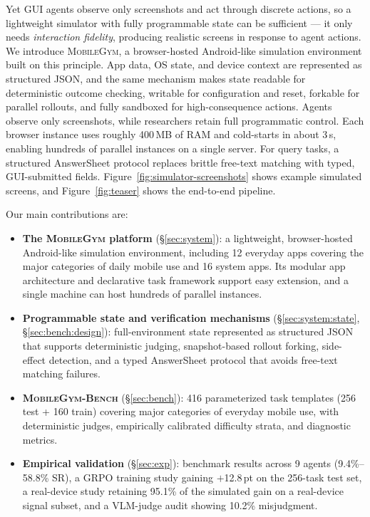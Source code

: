 \documentclass{llmxive}
\providecommand{\sys}{\textsc{MobileGym}}
\providecommand{\bench}{\textsc{MobileGym-Bench}}
\begin{document}
Yet GUI agents observe only screenshots and act through discrete actions, so a lightweight simulator with fully programmable state can be sufficient --- it only needs \emph{interaction fidelity}, producing realistic screens in response to agent actions. We introduce \sys{}, a browser-hosted Android-like simulation environment built on this principle. App data, OS state, and device context are represented as structured JSON, and the same mechanism makes state readable for deterministic outcome checking, writable for configuration and reset, forkable for parallel rollouts, and fully sandboxed for high-consequence actions. Agents observe only screenshots, while researchers retain full programmatic control. Each browser instance uses roughly 400\,MB of RAM and cold-starts in about 3\,s, enabling hundreds of parallel instances on a single server. For query tasks, a structured AnswerSheet protocol replaces brittle free-text matching with typed, GUI-submitted fields. Figure~\ref{fig:simulator-screenshots} shows example simulated screens, and Figure~\ref{fig:teaser} shows the end-to-end pipeline.

Our main contributions are:

\begin{itemize}
  \item \textbf{The \sys{} platform} (§\ref{sec:system}): a lightweight, browser-hosted Android-like simulation environment, including 12 everyday apps covering the major categories of daily mobile use and 16 system apps. Its modular app architecture and declarative task framework support easy extension, and a single machine can host hundreds of parallel instances.

  \item \textbf{Programmable state and verification mechanisms} (§\ref{sec:system:state}, §\ref{sec:bench:design}): full-environment state represented as structured JSON that supports deterministic judging, snapshot-based rollout forking, side-effect detection, and a typed AnswerSheet protocol that avoids free-text matching failures.

  \item \textbf{\bench{}} (§\ref{sec:bench}): 416 parameterized task templates (256 test + 160 train) covering major categories of everyday mobile use, with deterministic judges, empirically calibrated difficulty strata, and diagnostic metrics.

  \item \textbf{Empirical validation} (§\ref{sec:exp}): benchmark results across 9 agents (9.4\%--58.8\% SR), a GRPO training study gaining $+$12.8\,pt on the 256-task test set, a real-device study retaining 95.1\% of the simulated gain on a real-device signal subset, and a VLM-judge audit showing 10.2\% misjudgment.
\end{itemize}
\end{document}
